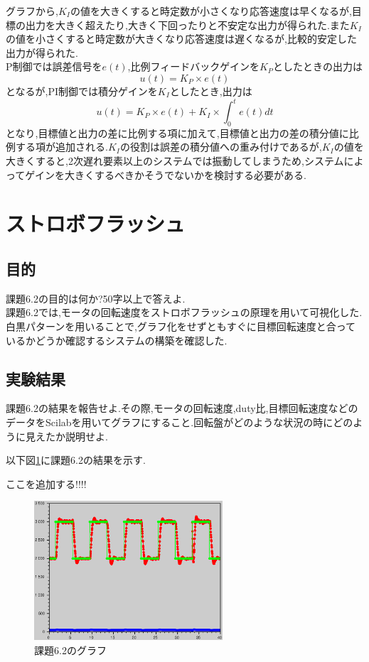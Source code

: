 \documentclass{jarticle}
\begin{document}
グラフから,$K_I$の値を大きくすると時定数が小さくなり応答速度は早くなるが,目標の出力を大きく超えたり,大きく下回ったりと不安定な出力が得られた.また$K_I$の値を小さくすると時定数が大きくなり応答速度は遅くなるが,比較的安定した出力が得られた. \\
P制御では誤差信号を$e(t)$,比例フィードバックゲインを$K_P$としたときの出力は
\begin{equation}
u(t) = K_P \times e(t)
\end{equation}
となるが,PI制御では積分ゲインを$K_I$としたとき,出力は
\begin{equation}
u(t) = K_P \times e(t) + K_I \times \int_0^t e(t) dt
\end{equation}
となり,目標値と出力の差に比例する項に加えて,目標値と出力の差の積分値に比例する項が追加される.$K_I$の役割は誤差の積分値への重み付けであるが,$K_I$の値を大きくすると,2次遅れ要素以上のシステムでは振動してしまうため,システムによってゲインを大きくするべきかそうでないかを検討する必要がある.

\section{ストロボフラッシュ}
\subsection{目的}
課題6.2の目的は何か?50字以上で答えよ. \\

課題6.2では,モータの回転速度をストロボフラッシュの原理を用いて可視化した.白黒パターンを用いることで,グラフ化をせずともすぐに目標回転速度と合っているかどうか確認するシステムの構築を確認した.

\subsection{実験結果}
課題6.2の結果を報告せよ.その際,モータの回転速度,duty比,目標回転速度などのデータをScilabを用いてグラフにすること.回転盤がどのような状況の時にどのように見えたか説明せよ.

以下図\ref{fig:kadai6-2}に課題6.2の結果を示す.

ここを追加する!!!!
\begin{figure}[H]
\begin{center}
\includegraphics[width=7.0cm]{images/kadai6-2.eps}
\caption{課題6.2のグラフ}
\label{fig:kadai6-2}
\end{center}
\end{figure}
\end{document}
